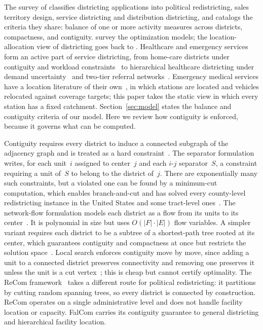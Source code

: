 \documentclass[preprint,12pt,authoryear]{elsarticle}
\theoremstyle{definition}
\begin{document}
The survey of \citet{kalcsics2020districting} classifies districting applications into political redistricting, sales territory design, service districting and distribution districting, and catalogs the criteria they share: balance of one or more activity measures across districts, compactness, and contiguity. \citet{rios2020optimal} survey the optimization models; the location-allocation view of districting goes back to \citet{hess1965nonpartisan}. Healthcare and emergency services form an active part of service districting, from home-care districts under contiguity and workload constraints~\citep{blais2003solving} to hierarchical healthcare districting under demand uncertainty~\citep{darmian2021optimization} and two-tier referral networks~\citep{wang2025cluster}. Emergency medical services have a location literature of their own~\citep{brotcorne2003ambulance,aringhieri2017emergency}, in which stations are located and vehicles relocated against coverage targets; this paper takes the static view in which every station has a fixed catchment. Section~\ref{sec:model} states the balance and contiguity criteria of our model. Here we review how contiguity is enforced, because it governs what can be computed.

Contiguity requires every district to induce a connected subgraph of the adjacency graph and is treated as a hard constraint~\citep{kalcsics2020districting}. The separator formulation writes, for each unit~$i$ assigned to center~$j$ and each $i$-$j$ separator~$S$, a constraint requiring a unit of~$S$ to belong to the district of~$j$. There are exponentially many such constraints, but a violated one can be found by a minimum-cut computation, which enables branch-and-cut and has solved every county-level redistricting instance in the United States and some tract-level ones~\citep{validi2022imposing, validi2022cutedges}. The network-flow formulation models each district as a flow from its units to its center~\citep{shirabe2005model}. It is polynomial in size but uses $O(|F|\cdot|E|)$ flow variables. A simpler variant requires each district to be a subtree of a shortest-path tree rooted at its center, which guarantees contiguity and compactness at once but restricts the solution space~\citep{kalcsics2020districting}. Local search enforces contiguity move by move, since adding a unit to a connected district preserves connectivity and removing one preserves it unless the unit is a cut vertex~\citep{ricca2013political}; this is cheap but cannot certify optimality. The ReCom framework~\citep{deford2021recombination} takes a different route for political redistricting: it partitions by cutting random spanning trees, so every district is connected by construction. ReCom operates on a single administrative level and does not handle facility location or capacity. FalCom carries its contiguity guarantee to general districting and hierarchical facility location.
\end{document}
